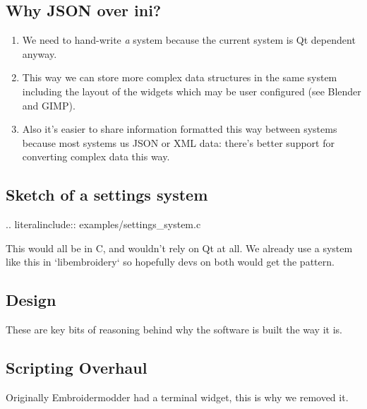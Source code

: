 \documentclass[11pt]{report}
\begin{document}
\subsection{Why JSON over ini?}

\begin{enumerate}
\item We need to hand-write \emph{a} system because the current system is Qt dependent anyway.
\item This way we can store more complex data structures in the same system including the layout of the widgets which may be user configured (see Blender and GIMP).
\item Also it's easier to share information formatted this way between systems because most systems us JSON or XML data: there's better support for converting complex data this way.
\end{enumerate}

\subsection{Sketch of a settings system}

.. literalinclude:: examples/settings\_system.c

This would all be in C, and wouldn't rely on Qt at all. We already use a
system like this in `libembroidery` so hopefully devs on both
would get the pattern.

\subsection{Design}

These are key bits of reasoning behind why the software is built the way
it is.

\subsection{Scripting Overhaul}

Originally Embroidermodder had a terminal widget, this is why we removed
it.
\end{document}
